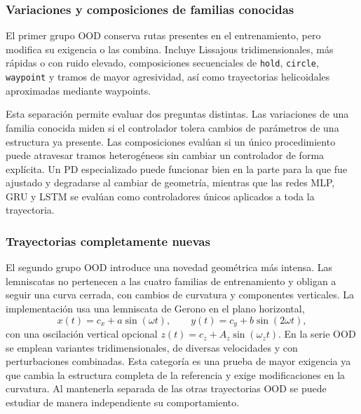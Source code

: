 \subsubsection*{Variaciones y composiciones de familias conocidas}
\label{subsubsec:variaciones-composiciones-ood}

El primer grupo OOD conserva rutas presentes en el entrenamiento, pero
modifica su exigencia o las combina. Incluye Lissajous
tridimensionales, más rápidas o con ruido elevado, composiciones secuenciales de
\texttt{hold}, \texttt{circle}, \texttt{waypoint} y tramos de mayor agresividad,
así como trayectorias helicoidales aproximadas mediante waypoints.

Esta separación permite evaluar dos preguntas distintas. Las variaciones de una
familia conocida miden si el controlador tolera cambios de parámetros de una estructura
ya presente. Las composiciones evalúan si un único procedimiento puede atravesar tramos
heterogéneos sin cambiar un controlador de forma explícita. Un PD especializado
puede funcionar bien en la parte para la que fue ajustado y degradarse al cambiar de
geometría, mientras que las redes MLP, GRU y LSTM se evalúan como controladores
únicos aplicados a toda la trayectoria.

\subsubsection*{Trayectorias completamente nuevas}
\label{subsubsec:trayectorias-nuevas-ood}

El segundo grupo OOD introduce una novedad geométrica más intensa. Las
lemniscatas no pertenecen a las cuatro familias de entrenamiento y obligan a
seguir una curva cerrada, con cambios de curvatura y componentes verticales.
La implementación usa una lemniscata de Gerono en el
plano horizontal,
\begin{equation}
 x(t)=c_x+a\sin(\omega t),\qquad
 y(t)=c_y+b\sin(2\omega t),
\end{equation}
con una oscilación vertical opcional
$z(t)=c_z+A_z\sin(\omega_z t)$. En la serie OOD se emplean variantes
tridimensionales, de diversas velocidades y con perturbaciones combinadas.
Esta categoría es una prueba de mayor exigencia ya que cambia la estructura completa
de la referencia y exige modificaciones en la curvatura. Al mantenerla separada de las
otras trayectorias OOD se puede estudiar de manera independiente su comportamiento.
